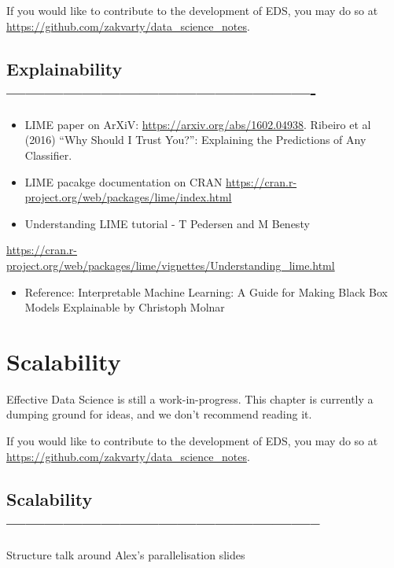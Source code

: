 \documentclass[
  12pt,
]{book}
\providecommand{\tightlist}{%
  \setlength{\itemsep}{0pt}\setlength{\parskip}{0pt}}
\begin{document}
If you would like to contribute to the development of EDS, you may do so at \url{https://github.com/zakvarty/data_science_notes}.

\hypertarget{explainability--}{%
\section{Explainability -------------------------------------------------}\label{explainability--}}

\begin{itemize}
\item
  LIME paper on ArXiV: \url{https://arxiv.org/abs/1602.04938}. Ribeiro et al (2016) ``Why Should I Trust You?'': Explaining the Predictions of Any Classifier.
\item
  LIME pacakge documentation on CRAN \url{https://cran.r-project.org/web/packages/lime/index.html}
\item
  Understanding LIME tutorial - T Pedersen and M Benesty
\end{itemize}

\url{https://cran.r-project.org/web/packages/lime/vignettes/Understanding_lime.html}

\begin{itemize}
\tightlist
\item
  Reference: Interpretable Machine Learning: A Guide for Making Black Box Models Explainable by Christoph Molnar
\end{itemize}

\hypertarget{production-scalability}{%
\chapter{Scalability}\label{production-scalability}}

Effective Data Science is still a work-in-progress. This chapter is currently a dumping ground for ideas, and we don't recommend reading it.

If you would like to contribute to the development of EDS, you may do so at \url{https://github.com/zakvarty/data_science_notes}.

\hypertarget{scalability}{%
\section{Scalability --------------------------------------------------}\label{scalability}}

Structure talk around Alex's parallelisation slides
\end{document}

